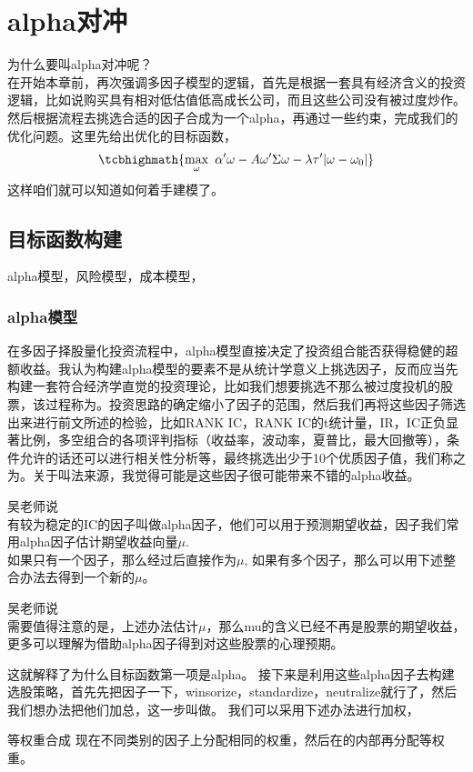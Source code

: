 \documentclass[12pt]{article}
\theoremstyle{definition}
\begin{document}
\section{alpha对冲}
为什么要叫alpha对冲呢？\\
在开始本章前，再次强调多因子模型的逻辑，首先是根据一套具有经济含义的投资逻辑，比如说购买具有相对低估值低高成长公司，而且这些公司没有被过度炒作。然后根据流程去挑选合适的因子合成为一个alpha，再通过一些约束，完成我们的优化问题。这里先给出优化的目标函数，
$$
\tcbhighmath{\max_{\omega} \ \alpha^\prime \omega - A\omega^\prime \Sigma \omega - \lambda \tau^\prime |\omega-\omega_0|}
$$
这样咱们就可以知道如何着手建模了。
\subsection{目标函数构建}
alpha模型，风险模型，成本模型，

\subsubsection{alpha模型}
在多因子择股量化投资流程中，alpha模型直接决定了投资组合能否获得稳健的超额收益。我认为构建alpha模型的要素不是从统计学意义上挑选因子，反而应当先构建一套符合经济学直觉的投资理论，比如我们想要挑选不那么被过度投机的股票，该过程称为。投资思路的确定缩小了因子的范围，然后我们再将这些因子筛选出来进行前文所述的检验，比如RANK IC，RANK IC的t统计量，IR，IC正负显著比例，多空组合的各项评判指标（收益率，波动率，夏普比，最大回撤等），条件允许的话还可以进行相关性分析等，最终挑选出少于10个优质因子值，我们称之为。关于叫法来源，我觉得可能是这些因子很可能带来不错的alpha收益。\par
\begin{sremark}{}{}吴老师说 \\
有较为稳定的IC的因子叫做alpha因子，他们可以用于预测期望收益，因子我们常用alpha因子估计期望收益向量$\mu$. \\
如果只有一个因子，那么经过后直接作为$\mu$, 如果有多个因子，那么可以用下述整合办法去得到一个新的$\mu$。 
\end{sremark}

\begin{sremark}{}{}吴老师说 \\
需要值得注意的是，上述办法估计$\mu$，那么mu的含义已经不再是股票的期望收益，更多可以理解为借助alpha因子得到对这些股票的心理预期。
\end{sremark}

这就解释了为什么目标函数第一项是alpha。
接下来是利用这些alpha因子去构建选股策略，首先先把因子一下，winsorize，standardize，neutralize就行了，然后我们想办法把他们加总，这一步叫做。
我们可以采用下述办法进行加权，
\begin{sdefinition}{等权重合成}{}
现在不同类别的因子上分配相同的权重，然后在的内部再分配等权重。
\end{sdefinition}
\end{document}
